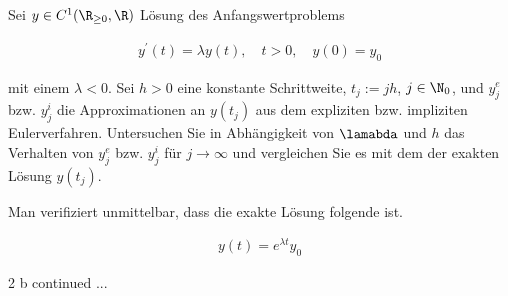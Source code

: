 \begin{exercise}

Sei $y \in C^1(\R_{\geq 0}, \R)$ Lösung des Anfangswertproblems

\begin{align*}
  y^\prime(t) = \lambda y(t),
  \quad
  t > 0,
  \quad
  y(0) = y_0
\end{align*}

mit einem $\lambda < 0$.
Sei $h > 0$ eine konstante Schrittweite, $t_j := jh$, $j \in \N_0$, und $y^e_j$ bzw. $y^i_j$ die Approximationen an $y(t_j)$ aus dem expliziten bzw. impliziten Eulerverfahren.
Untersuchen Sie in Abhängigkeit von $\lamabda$ und $h$ das Verhalten von $y^e_j$ bzw. $y^i_j$ für $j \to \infty$ und vergleichen Sie es mit dem der exakten Lösung $y(t_j)$.

\end{exercise}

\begin{solution}

Man verifiziert unmittelbar, dass die exakte Lösung folgende ist.

\begin{align*}
  y(t) = e^{\lambda t} y_0
\end{align*}

2 b continued ...

\end{solution}
